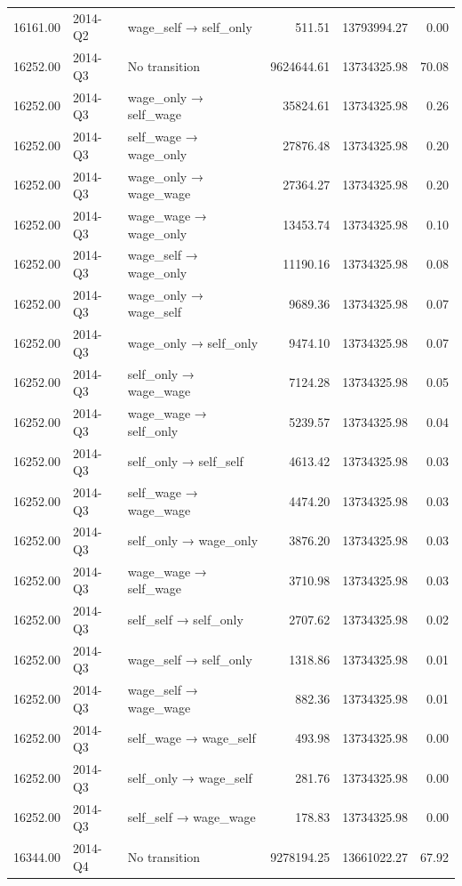 \begin{table}[ht]
{\begin{tabular}{rllrrr}
  16161.00 & 2014-Q2 & wage\_self → self\_only & 511.51 & 13793994.27 & 0.00 \\ 
  16252.00 & 2014-Q3 & No transition & 9624644.61 & 13734325.98 & 70.08 \\ 
  16252.00 & 2014-Q3 & wage\_only → self\_wage & 35824.61 & 13734325.98 & 0.26 \\ 
  16252.00 & 2014-Q3 & self\_wage → wage\_only & 27876.48 & 13734325.98 & 0.20 \\ 
  16252.00 & 2014-Q3 & wage\_only → wage\_wage & 27364.27 & 13734325.98 & 0.20 \\ 
  16252.00 & 2014-Q3 & wage\_wage → wage\_only & 13453.74 & 13734325.98 & 0.10 \\ 
  16252.00 & 2014-Q3 & wage\_self → wage\_only & 11190.16 & 13734325.98 & 0.08 \\ 
  16252.00 & 2014-Q3 & wage\_only → wage\_self & 9689.36 & 13734325.98 & 0.07 \\ 
  16252.00 & 2014-Q3 & wage\_only → self\_only & 9474.10 & 13734325.98 & 0.07 \\ 
  16252.00 & 2014-Q3 & self\_only → wage\_wage & 7124.28 & 13734325.98 & 0.05 \\ 
  16252.00 & 2014-Q3 & wage\_wage → self\_only & 5239.57 & 13734325.98 & 0.04 \\ 
  16252.00 & 2014-Q3 & self\_only → self\_self & 4613.42 & 13734325.98 & 0.03 \\ 
  16252.00 & 2014-Q3 & self\_wage → wage\_wage & 4474.20 & 13734325.98 & 0.03 \\ 
  16252.00 & 2014-Q3 & self\_only → wage\_only & 3876.20 & 13734325.98 & 0.03 \\ 
  16252.00 & 2014-Q3 & wage\_wage → self\_wage & 3710.98 & 13734325.98 & 0.03 \\ 
  16252.00 & 2014-Q3 & self\_self → self\_only & 2707.62 & 13734325.98 & 0.02 \\ 
  16252.00 & 2014-Q3 & wage\_self → self\_only & 1318.86 & 13734325.98 & 0.01 \\ 
  16252.00 & 2014-Q3 & wage\_self → wage\_wage & 882.36 & 13734325.98 & 0.01 \\ 
  16252.00 & 2014-Q3 & self\_wage → wage\_self & 493.98 & 13734325.98 & 0.00 \\ 
  16252.00 & 2014-Q3 & self\_only → wage\_self & 281.76 & 13734325.98 & 0.00 \\ 
  16252.00 & 2014-Q3 & self\_self → wage\_wage & 178.83 & 13734325.98 & 0.00 \\ 
  16344.00 & 2014-Q4 & No transition & 9278194.25 & 13661022.27 & 67.92 \\ 

\end{tabular}}
\end{table}
